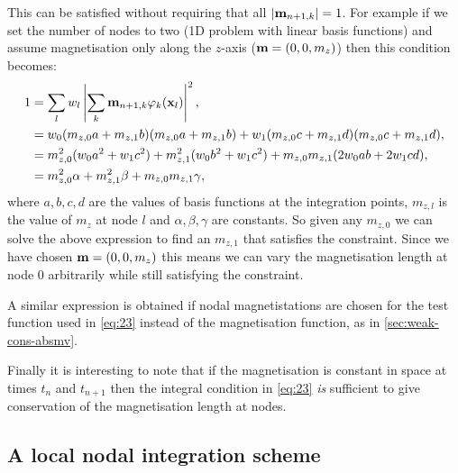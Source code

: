 This can be satisfied without requiring that all $\left|{\mathbf{m}_{n+1, k}} \right| = 1$.
For example if we set the number of nodes to two (\ie 1D problem with linear basis functions) and assume magnetisation only along the $z$-axis (\ie  $\mathbf{m} = (0, 0, m_z)$) then this condition becomes:
\begin{equation}
  \begin{aligned}
    1 &= \sum_l w_l \left|{\sum_k \mathbf{m}_{n+1, k} \varphi_k(\mathbf{x}_l)} \right|^2, \\
    &= w_0 (m_{z,0} a + m_{z,1} b)(m_{z,0} a + m_{z,1} b) + w_1 (m_{z,0} c + m_{z,1} d)(m_{z,0} c + m_{z,1} d), \\
    &= m_{z,0}^2 (w_0 a^2 + w_1 c^2) + m_{z,1}^2 (w_0 b^2 + w_1 c^2) + m_{z,0} m_{z,1} (2w_0ab + 2w_1cd), \\
    &= m_{z,0}^2 \alpha + m_{z,1}^2 \beta + m_{z,0} m_{z,1} \gamma, \\
  \end{aligned}
\end{equation}
where $a,b,c,d$ are the values of basis functions at the integration points, $m_{z,l}$ is the value of $m_z$ at node $l$ and $\alpha, \beta, \gamma$ are constants.
So given any $m_{z,0}$ we can solve the above expression to find an $m_{z,1}$ that satisfies the constraint.
Since we have chosen $\mathbf{m} = (0, 0, m_z)$ this means we can vary the magnetisation length at node 0 arbitrarily while still satisfying the constraint.

A similar expression is obtained if nodal magnetistations are chosen for the test function used in \cref{eq:23} instead of the magnetisation function, as in \cref{sec:weak-cons-absmv}.

Finally it is interesting to note that if the magnetisation is constant in space at times $t_n$ and $t_{n+1}$ then the integral condition in \cref{eq:23} \emph{is} sufficient to give conservation of the magnetisation length at nodes.


\subsection{A local nodal integration scheme}
\label{sec:local-nodal-integr}


